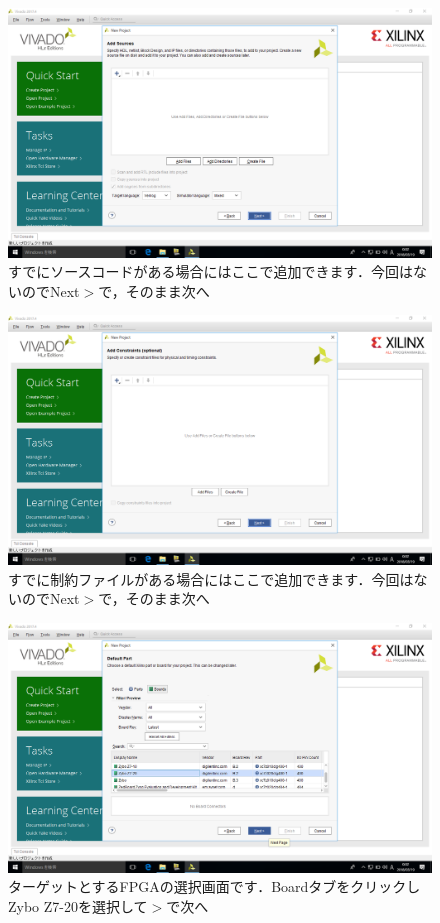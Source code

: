 \documentclass[a4paper,dvipdfmx]{jsarticle}
\begin{document}
 \begin{figure}[H]
  \begin{center}
   \includegraphics[width=.8\textwidth]{chapter03_figures/VirtualBox_Windows10_19_03_2018_00_02_24.png}
  \end{center}
  \caption{すでにソースコードがある場合にはここで追加できます．今回はないのでNext$\gt$で，そのまま次へ}
 \end{figure}

 \begin{figure}[H]
  \begin{center}
   \includegraphics[width=.8\textwidth]{chapter03_figures/VirtualBox_Windows10_19_03_2018_00_02_30.png}
  \end{center}
  \caption{すでに制約ファイルがある場合にはここで追加できます．今回はないのでNext$\gt$で，そのまま次へ}
 \end{figure}

 \begin{figure}[H]
  \begin{center}
   \includegraphics[width=.8\textwidth]{chapter03_figures/VirtualBox_Windows10_19_03_2018_00_02_49.png}
  \end{center}
  \caption{ターゲットとするFPGAの選択画面です．BoardタブをクリックしZybo Z7-20を選択して$\gt$で次へ}
 \end{figure}
\end{document}
